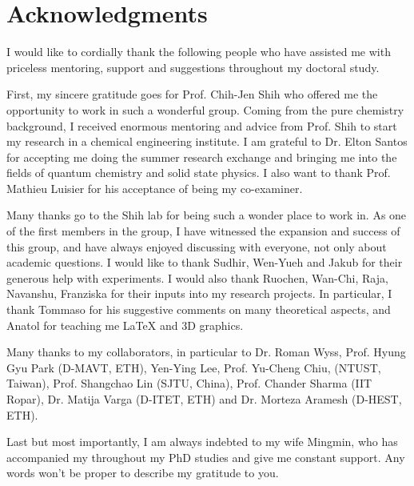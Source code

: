 
\bigskip

\begingroup
\let\clearpage\relax
\let\cleardoublepage\relax
\let\cleardoublepage\relax
\chapter*{Acknowledgments}

\def\thanks#1{%
\begingroup
\leftskip1em
\noindent #1
\par
\endgroup
}

I would like to cordially thank the following people who have assisted
me with priceless mentoring, support and suggestions throughout my doctoral study.

First, my sincere gratitude goes for Prof. Chih-Jen Shih who
offered me the opportunity to work in such a wonderful group. Coming
from the pure chemistry background, I received enormous mentoring and
advice from Prof. Shih to start my research in a chemical engineering
institute. 
%
I am grateful to Dr. Elton Santos for accepting me doing the summer research exchange and bringing me into the fields of quantum chemistry and solid state physics.
%
I also want to thank Prof. Mathieu Luisier for his acceptance of being
my co-examiner.

Many thanks go to the Shih lab for being such a wonder place to work
in. As one of the first members in the group, I have witnessed the
expansion and success of this group, and have always enjoyed
discussing with everyone, not only about academic questions. I would
like to thank Sudhir, Wen-Yueh and Jakub for their generous help with
experiments. I would also thank Ruochen, Wan-Chi, Raja, Navanshu,
Franziska for their inputs into my research projects. In particular, I
thank Tommaso for his suggestive comments on many theoretical aspects,
and Anatol for teaching me \LaTeX{} and 3D graphics.


Many thanks to my collaborators, in particular to Dr. Roman Wyss,
Prof. Hyung Gyu Park (D-MAVT, ETH), Yen-Ying Lee, Prof. Yu-Cheng Chiu,
(NTUST, Taiwan), Prof. Shangchao Lin (SJTU, China), Prof. Chander
Sharma (IIT Ropar), Dr. Matija Varga (D-ITET, ETH) and Dr. Morteza
Aramesh (D-HEST, ETH).

Last but most importantly, I am always indebted to my wife Mingmin,
who has accompanied my throughout my PhD studies and give me constant
support. Any words won't be proper to describe my gratitude to you.

\endgroup

